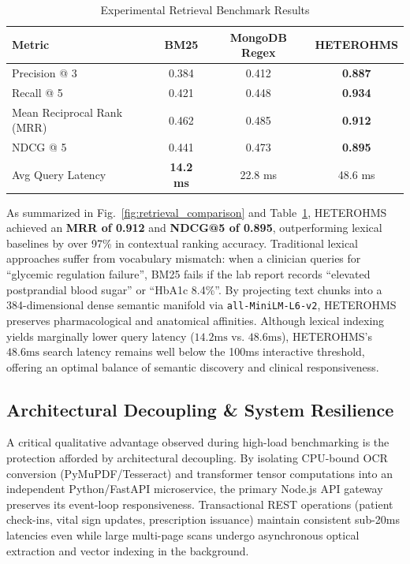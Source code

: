 \documentclass[conference]{IEEEtran}
\begin{document}
\begin{table}[htbp]
\centering
\caption{Experimental Retrieval Benchmark Results}
\label{tab:retrieval_results}
\begin{tabularx}{\columnwidth}{@{}X c c c@{}}
\toprule
\textbf{Metric} & \textbf{BM25} & \textbf{MongoDB Regex} & \textbf{HETEROHMS} \\ \midrule
Precision @ 3 & 0.384 & 0.412 & \textbf{0.887} \\
Recall @ 5 & 0.421 & 0.448 & \textbf{0.934} \\
Mean Reciprocal Rank (MRR) & 0.462 & 0.485 & \textbf{0.912} \\
NDCG @ 5 & 0.441 & 0.473 & \textbf{0.895} \\
Avg Query Latency & \textbf{14.2 ms} & 22.8 ms & 48.6 ms \\ \bottomrule
\end{tabularx}
\end{table}

As summarized in Fig.~\ref{fig:retrieval_comparison} and Table~\ref{tab:retrieval_results}, HETEROHMS achieved an \textbf{MRR of 0.912} and \textbf{NDCG@5 of 0.895}, outperforming lexical baselines by over 97\% in contextual ranking accuracy. Traditional lexical approaches suffer from vocabulary mismatch: when a clinician queries for ``glycemic regulation failure'', BM25 fails if the lab report records ``elevated postprandial blood sugar'' or ``HbA1c 8.4\%''. By projecting text chunks into a 384-dimensional dense semantic manifold via \texttt{all-MiniLM-L6-v2}, HETEROHMS preserves pharmacological and anatomical affinities. Although lexical indexing yields marginally lower query latency ($14.2\text{ms}$ vs. $48.6\text{ms}$), HETEROHMS's $48.6\text{ms}$ search latency remains well below the 100ms interactive threshold, offering an optimal balance of semantic discovery and clinical responsiveness.

\subsection{Architectural Decoupling \& System Resilience}
A critical qualitative advantage observed during high-load benchmarking is the protection afforded by architectural decoupling. By isolating CPU-bound OCR conversion (PyMuPDF/Tesseract) and transformer tensor computations into an independent Python/FastAPI microservice, the primary Node.js API gateway preserves its event-loop responsiveness. Transactional REST operations (patient check-ins, vital sign updates, prescription issuance) maintain consistent sub-20ms latencies even while large multi-page scans undergo asynchronous optical extraction and vector indexing in the background.
\end{document}

